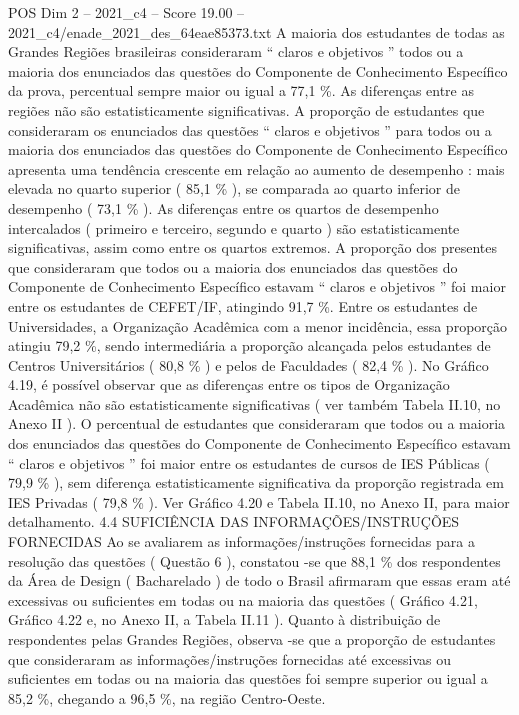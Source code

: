 \begin{textsample}{POS Dim 2 – 2021\_c4 – Score 19.00 – 2021\_c4/enade\_2021\_des\_64eae85373.txt}
A maioria dos estudantes de todas as Grandes Regiões brasileiras consideraram “ claros e objetivos ” todos ou a maioria dos enunciados das questões do Componente de Conhecimento Específico da prova, percentual sempre maior ou igual a 77,1 \%.
As diferenças entre as regiões não são estatisticamente significativas.
A proporção de estudantes que consideraram os enunciados das questões “ claros e objetivos ” para todos ou a maioria dos enunciados das questões do Componente de Conhecimento Específico apresenta uma tendência crescente em relação ao aumento de desempenho : mais elevada no quarto superior ( 85,1 \% ), se comparada ao quarto inferior de desempenho ( 73,1 \% ).
As diferenças entre os quartos de desempenho intercalados ( primeiro e terceiro, segundo e quarto ) são estatisticamente significativas, assim como entre os quartos extremos.
A proporção dos presentes que consideraram que todos ou a maioria dos enunciados das questões do Componente de Conhecimento Específico estavam “ claros e objetivos ” foi maior entre os estudantes de CEFET/IF, atingindo 91,7 \%.
Entre os estudantes de Universidades, a Organização Acadêmica com a menor incidência, essa proporção atingiu 79,2 \%, sendo intermediária a proporção alcançada pelos estudantes de Centros Universitários ( 80,8 \% ) e pelos de Faculdades ( 82,4 \% ).
No Gráfico 4.19, é possível observar que as diferenças entre os tipos de Organização Acadêmica não são estatisticamente significativas ( ver também Tabela II.10, no Anexo II ).
O percentual de estudantes que consideraram que todos ou a maioria dos enunciados das questões do Componente de Conhecimento Específico estavam “ claros e objetivos ” foi maior entre os estudantes de cursos de IES Públicas ( 79,9 \% ), sem diferença estatisticamente significativa da proporção registrada em IES Privadas ( 79,8 \% ).
Ver Gráfico 4.20 e Tabela II.10, no Anexo II, para maior detalhamento. 4.4 SUFICIÊNCIA DAS INFORMAÇÕES/INSTRUÇÕES FORNECIDAS Ao se avaliarem as informações/instruções fornecidas para a resolução das questões ( Questão 6 ), constatou -se que 88,1 \% dos respondentes da Área de Design ( Bacharelado ) de todo o Brasil afirmaram que essas eram até excessivas ou suficientes em todas ou na maioria das questões ( Gráfico 4.21, Gráfico 4.22 e, no Anexo II, a Tabela II.11 ).
Quanto à distribuição de respondentes pelas Grandes Regiões, observa -se que a proporção de estudantes que consideraram as informações/instruções fornecidas até excessivas ou suficientes em todas ou na maioria das questões foi sempre superior ou igual a 85,2 \%, chegando a 96,5 \%, na região Centro-Oeste.

\end{textsample}
